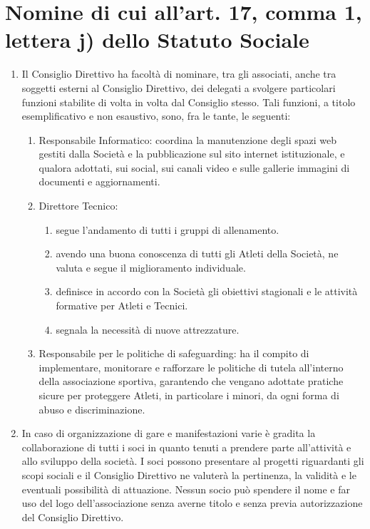 \documentclass{djtsasddoc}
\begin{document}
	\section{Nomine di cui all'art. 17, comma 1, lettera j) dello Statuto Sociale}
	\begin{enumerate}
		\item Il Consiglio Direttivo ha facoltà di nominare, tra gli associati, anche tra soggetti esterni al Consiglio Direttivo, dei delegati a svolgere particolari funzioni stabilite di volta in  volta dal Consiglio stesso. Tali funzioni, a titolo esemplificativo e non esaustivo, sono, fra le tante, le seguenti:
		\begin{enumerate}
			\item Responsabile Informatico: coordina la manutenzione degli spazi web gestiti dalla Società e la pubblicazione sul sito internet istituzionale, e qualora adottati, sui social, sui canali video e sulle gallerie immagini di documenti e aggiornamenti.
			\item Direttore Tecnico: 
			\begin{enumerate}
				\item segue l'andamento di tutti i gruppi di allenamento.
				\item avendo una buona conoscenza di tutti gli Atleti della Società, ne valuta e segue il miglioramento individuale.
				\item definisce in accordo con la Società gli obiettivi stagionali e le attività formative per Atleti e Tecnici.
				\item segnala la necessità di nuove attrezzature.
			\end{enumerate}
			\item Responsabile per le politiche di safeguarding: ha il compito di implementare, monitorare e rafforzare le politiche di tutela all'interno della associazione sportiva, garantendo che vengano adottate pratiche sicure per proteggere Atleti, in particolare i minori, da ogni forma di abuso e discriminazione.
		\end{enumerate}
		\item In caso di organizzazione di gare e manifestazioni varie è gradita la collaborazione di tutti i soci in quanto tenuti a prendere parte all'attività e allo sviluppo della società. I soci possono presentare al progetti riguardanti gli scopi sociali e il Consiglio Direttivo ne valuterà la pertinenza, la validità e le eventuali possibilità di attuazione. Nessun socio può spendere il nome e far uso del logo dell'associazione senza averne titolo e senza previa autorizzazione del Consiglio Direttivo.
	\end{enumerate}
	
\end{document}
